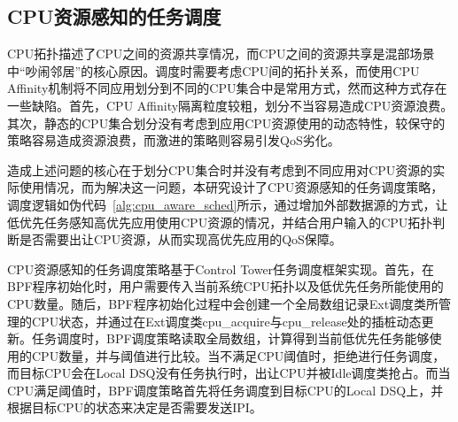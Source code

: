 

\subsection{CPU资源感知的任务调度} 


CPU拓扑描述了CPU之间的资源共享情况，而CPU之间的资源共享是混部场景中“吵闹邻居”的核心原因。调度时需要考虑CPU间的拓扑关系，而使用CPU Affinity机制将不同应用划分到不同的CPU集合中是常用方式，然而这种方式存在一些缺陷。首先，CPU Affinity隔离粒度较粗，划分不当容易造成CPU资源浪费。其次，静态的CPU集合划分没有考虑到应用CPU资源使用的动态特性，较保守的策略容易造成资源浪费，而激进的策略则容易引发QoS劣化。

造成上述问题的核心在于划分CPU集合时并没有考虑到不同应用对CPU资源的实际使用情况，而为解决这一问题，本研究设计了CPU资源感知的任务调度策略，调度逻辑如伪代码~\ref{alg:cpu_aware_sched}所示，通过增加外部数据源的方式，让低优先任务感知高优先应用使用CPU资源的情况，并结合用户输入的CPU拓扑判断是否需要出让CPU资源，从而实现高优先应用的QoS保障。

CPU资源感知的任务调度策略基于Control Tower任务调度框架实现。首先，在BPF程序初始化时，用户需要传入当前系统CPU拓扑以及低优先任务所能使用的CPU数量。随后，BPF程序初始化过程中会创建一个全局数组记录Ext调度类所管理的CPU状态，并通过在Ext调度类cpu\_acquire与cpu\_release处的插桩动态更新。任务调度时，BPF调度策略读取全局数组，计算得到当前低优先任务能够使用的CPU数量，并与阈值进行比较。当不满足CPU阈值时，拒绝进行任务调度，而目标CPU会在Local DSQ没有任务执行时，出让CPU并被Idle调度类抢占。而当CPU满足阈值时，BPF调度策略首先将任务调度到目标CPU的Local DSQ上，并根据目标CPU的状态来决定是否需要发送IPI。

